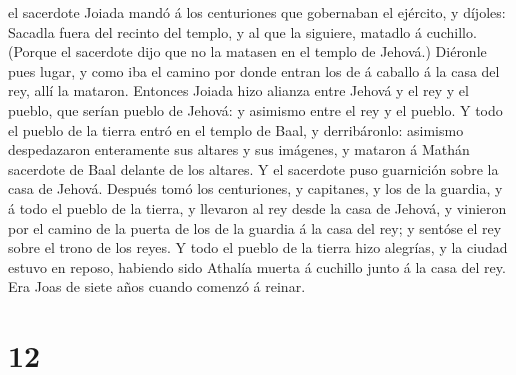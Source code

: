 el sacerdote Joiada mandó á los centuriones que gobernaban el ejército,
y díjoles: Sacadla fuera del recinto del templo, y al que la siguiere,
matadlo á cuchillo. (Porque el sacerdote dijo que no la matasen en el
templo de Jehová.)  Diéronle pues lugar, y como iba el
camino por donde entran los de á caballo á la casa del rey, allí la
mataron.  Entonces Joiada hizo alianza entre Jehová y el
rey y el pueblo, que serían pueblo de Jehová: y asimismo entre el rey y
el pueblo.  Y todo el pueblo de la tierra entró en el
templo de Baal, y derribáronlo: asimismo despedazaron enteramente sus
altares y sus imágenes, y mataron á Mathán sacerdote de Baal delante de
los altares. Y el sacerdote puso guarnición sobre la casa de Jehová.
 Después tomó los centuriones, y capitanes, y los de la
guardia, y á todo el pueblo de la tierra, y llevaron al rey desde la
casa de Jehová, y vinieron por el camino de la puerta de los de la
guardia á la casa del rey; y sentóse el rey sobre el trono de los reyes.
 Y todo el pueblo de la tierra hizo alegrías, y la ciudad
estuvo en reposo, habiendo sido Athalía muerta á cuchillo junto á la
casa del rey.  Era Joas de siete años cuando comenzó á
reinar.

\hypertarget{section-11}{%
\section{12}\label{section-11}}

